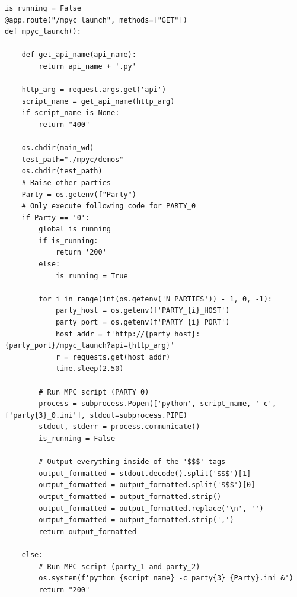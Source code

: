 \begin{lstlisting}[caption={Launching MPC and returning formatted output}, label={lst:mpyclaunch}, frame=single, breaklines=true]
is_running = False
@app.route("/mpyc_launch", methods=["GET"])
def mpyc_launch():

    def get_api_name(api_name):
        return api_name + '.py'

    http_arg = request.args.get('api')
    script_name = get_api_name(http_arg)
    if script_name is None:
        return "400"

    os.chdir(main_wd)
    test_path="./mpyc/demos"
    os.chdir(test_path)
    # Raise other parties
    Party = os.getenv(f"Party")
    # Only execute following code for PARTY_0
    if Party == '0':
        global is_running
        if is_running:
            return '200'
        else:
            is_running = True

        for i in range(int(os.getenv('N_PARTIES')) - 1, 0, -1):
            party_host = os.getenv(f'PARTY_{i}_HOST')
            party_port = os.getenv(f'PARTY_{i}_PORT')
            host_addr = f'http://{party_host}:{party_port}/mpyc_launch?api={http_arg}'
            r = requests.get(host_addr)
            time.sleep(2.50)

        # Run MPC script (PARTY_0)
        process = subprocess.Popen(['python', script_name, '-c', f'party{3}_0.ini'], stdout=subprocess.PIPE)
        stdout, stderr = process.communicate()
        is_running = False

        # Output everything inside of the '$$$' tags
        output_formatted = stdout.decode().split('$$$')[1]
        output_formatted = output_formatted.split('$$$')[0]
        output_formatted = output_formatted.strip()
        output_formatted = output_formatted.replace('\n', '')
        output_formatted = output_formatted.strip(',')
        return output_formatted

    else:
        # Run MPC script (party_1 and party_2)
        os.system(f'python {script_name} -c party{3}_{Party}.ini &')
        return "200"
\end{lstlisting}

